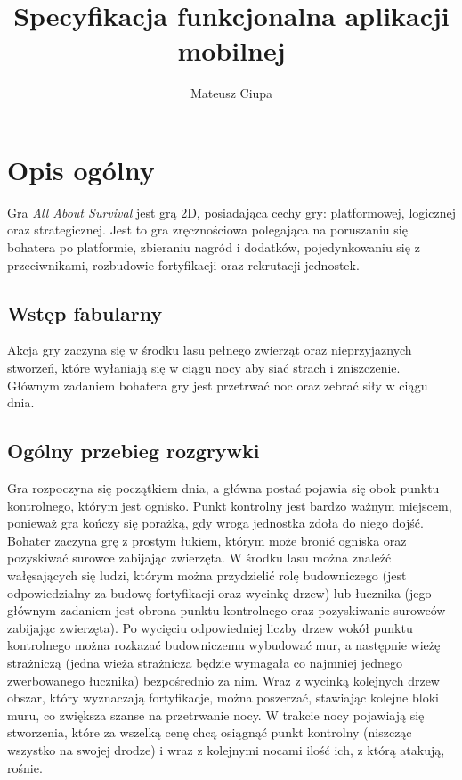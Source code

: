 \documentclass[12pt, a4paper]{article}
\author{Mateusz Ciupa}
\title{Specyfikacja funkcjonalna aplikacji mobilnej}
\begin{document}
\maketitle
\date
\tableofcontents

\section{Opis ogólny}
Gra \textit{All About Survival} jest grą 2D, posiadająca cechy gry: platformowej, logicznej oraz strategicznej. Jest to gra zręcznościowa polegająca na poruszaniu się bohatera po platformie, zbieraniu nagród i dodatków, pojedynkowaniu się z przeciwnikami, rozbudowie fortyfikacji oraz rekrutacji jednostek. 

\subsection{Wstęp fabularny}
Akcja gry zaczyna się w środku lasu pełnego zwierząt oraz nieprzyjaznych stworzeń, które wyłaniają się w ciągu nocy aby siać strach i zniszczenie. Głównym zadaniem bohatera gry jest przetrwać noc oraz zebrać siły w ciągu dnia.

\subsection{Ogólny przebieg rozgrywki}

Gra rozpoczyna się początkiem dnia, a główna postać pojawia się obok punktu kontrolnego, którym jest ognisko. Punkt kontrolny jest bardzo ważnym miejscem, ponieważ gra kończy się porażką, gdy wroga jednostka zdoła do niego dojść. Bohater zaczyna grę z prostym łukiem, którym może bronić ogniska oraz pozyskiwać surowce zabijając zwierzęta. W środku lasu można znaleźć wałęsających się ludzi, którym można przydzielić rolę budowniczego (jest odpowiedzialny za budowę fortyfikacji oraz wycinkę drzew) lub łucznika (jego głównym zadaniem jest obrona punktu kontrolnego oraz pozyskiwanie surowców zabijając zwierzęta). Po wycięciu odpowiedniej liczby drzew wokół punktu kontrolnego można rozkazać budowniczemu wybudować mur, a następnie wieżę strażniczą (jedna wieża strażnicza będzie wymagała co najmniej jednego zwerbowanego łucznika) bezpośrednio za nim. Wraz z wycinką kolejnych drzew obszar, który wyznaczają fortyfikacje, można poszerzać, stawiając kolejne bloki muru, co zwiększa szanse na przetrwanie nocy. W trakcie nocy pojawiają się stworzenia, które za wszelką cenę chcą osiągnąć punkt kontrolny (niszcząc wszystko na swojej drodze) i wraz z kolejnymi nocami ilość ich, z którą atakują, rośnie. 
\end{document}
